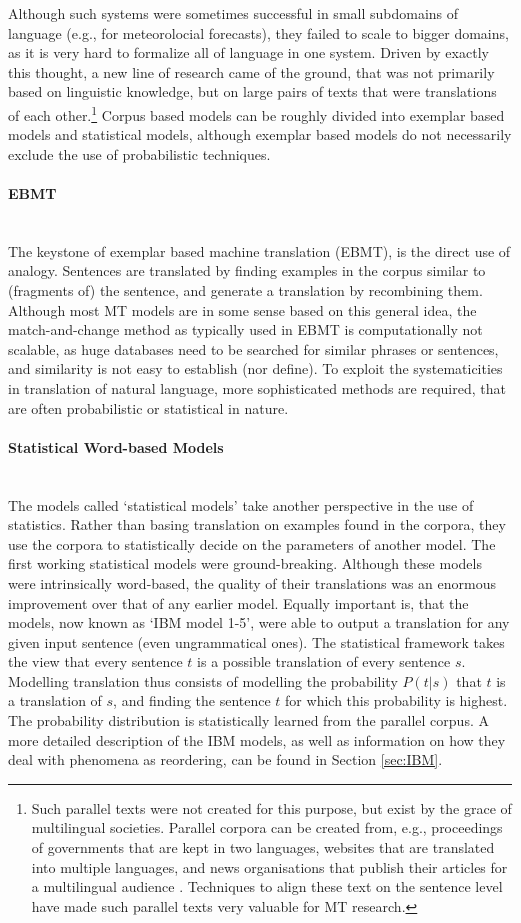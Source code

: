 \documentclass{report}
\newcommand{\myparagraph}[1]{\paragraph{#1}\mbox{}\\}
\theoremstyle{break}
\begin{document}
Although such systems were sometimes successful in small subdomains of language (e.g., \cite{chandioux1976meteo} for meteorolocial forecasts), they failed to scale to bigger domains, as it is very hard to formalize all of language in one system. Driven by exactly this thought, a new line of research came of the ground, that was not primarily based on linguistic knowledge, but on large pairs of texts that were translations of each other.\footnote{Such parallel texts were not created for this purpose, but exist by the grace of multilingual societies. Parallel corpora can be created from, e.g., proceedings of governments that are kept in two languages, websites that are translated into multiple languages, and news organisations that publish their articles for a multilingual audience \citep{koehn2008statistical}. Techniques to align these text on the sentence level \citep[e.g.,][]{varga2007parallel} have made such parallel texts very valuable for MT research.} Corpus based models can be roughly divided into exemplar based models and statistical models, although exemplar based models do not necessarily exclude the use of probabilistic techniques.

\myparagraph{EBMT}
The keystone of exemplar based machine translation (EBMT), is the direct use of analogy. Sentences are translated by finding examples in the corpus similar to (fragments of) the sentence, and generate a translation by recombining them. Although most MT models are in some sense based on this general idea, the match-and-change method as typically used in EBMT is computationally not scalable, as huge databases need to be searched for similar phrases or sentences, and similarity is not easy to establish (nor define). To exploit the systematicities in translation of natural language, more sophisticated methods are required, that are often probabilistic or statistical in nature.


\myparagraph{Statistical Word-based Models}
The models called `statistical models' take another perspective in the use of statistics. Rather than basing translation on examples found in the corpora, they use the corpora to statistically decide on the parameters of another model. The first working statistical models \citep{brown1988statistical,brown1990statistical,brown1993mathematics} were ground-breaking. Although these models were intrinsically word-based, the quality of their translations was an enormous improvement over that of any earlier model. Equally important is, that the models, now known as `IBM model 1-5', were able to output a translation for any given input sentence (even ungrammatical ones). The statistical framework takes the view that every sentence $t$ is a possible translation of every sentence $s$. Modelling translation thus consists of modelling the probability $P(t|s)$ that $t$ is a translation of $s$, and finding the sentence $t$ for which this probability is highest. The probability distribution is statistically learned from the parallel corpus. A more detailed description of the IBM models, as well as information on how they deal with phenomena as reordering, can be found in Section \ref{sec:IBM}.
\end{document}

